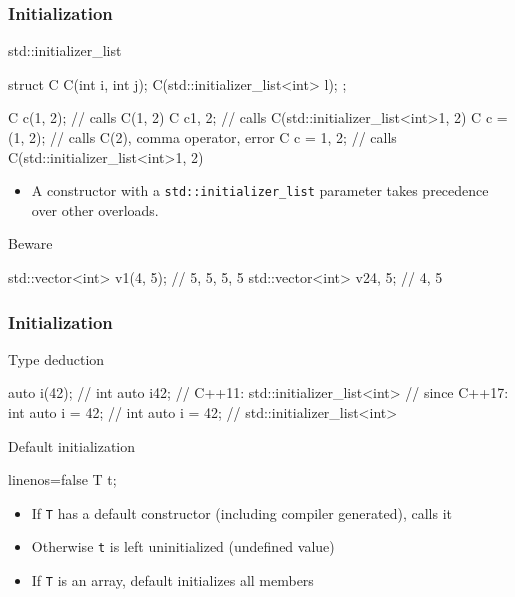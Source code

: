 \begin{frame}[fragile,shrink=10]
  \frametitle{Initialization}
  \begin{block}{std::initializer\_list}
    \begin{cppcode}
      struct C {
        C(int i, int j);
        C(std::initializer_list<int> l);
      };

      C c(1, 2);    // calls C(1, 2)
      C c{1, 2};    // calls C(std::initializer_list<int>{1, 2})
      C c = (1, 2); // calls C(2), comma operator, error
      C c = {1, 2}; // calls C(std::initializer_list<int>{1, 2})
    \end{cppcode}
    \begin{itemize}
      \item A constructor with a \texttt{std::initializer_list} parameter takes precedence over other overloads.
    \end{itemize}
  \end{block}
  \begin{alertblock}{Beware}
    \begin{cppcode}
      std::vector<int> v1(4, 5); // {5, 5, 5, 5}
      std::vector<int> v2{4, 5}; // {4, 5}
    \end{cppcode}
  \end{alertblock}
\end{frame}

\begin{frame}[fragile]
  \frametitle{Initialization}
  \begin{block}{Type deduction}
    \begin{cppcode}
      auto i(42);    // int
      auto i{42};    // C++11: std::initializer_list<int>
                     // since C++17: int
      auto i = 42;   // int
      auto i = {42}; // std::initializer_list<int>
    \end{cppcode}
  \end{block}
\end{frame}

\begin{frame}[fragile]
  \begin{block}{Default initialization}
    \begin{cppcode*}{linenos=false}
      T t;
    \end{cppcode*}
    \begin{itemize}
      \item If \texttt{T} has a default constructor (including compiler generated), calls it
      \item Otherwise \texttt{t} is left uninitialized (undefined value)
      \item If \texttt{T} is an array, default initializes all members
    \end{itemize}
  \end{block}
\end{frame}

